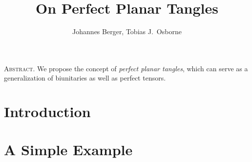 \documentclass[11pt,a4paper,twoside]{article}
\author{Johannes Berger, Tobias J.\ Osborne}
\title{On Perfect Planar Tangles}
\date{}
\begin{document}
\pagestyle{headings}
\maketitle
\begin{center}
	\begin{minipage}{0.8\textwidth}
		\textsc{Abstract.} We propose the concept of \emph{perfect planar tangles}, which can serve as a generalization of biunitaries as well as perfect tensors.
	\end{minipage}
\end{center}

\tikzexternaldisable
\section{Introduction}
	

\section{A Simple Example}
	

%	

%	

%	



\pagestyle{plain}
\nocite{*}

\end{document}
